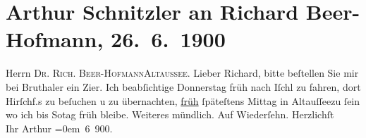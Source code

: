 

         
         \renewcommand{\erwaehntePersonen}{Personen: Richard Beer-Hofmann, Georg Hirschfeld, Elly Petersen}
         \renewcommand{\erwaehnteOrte}{Orte: Altaussee, Bad Ischl, Gasthaus Brunnthaler, IX., Alsergrund, Wien}
         \renewcommand{\erwaehnteWerke}{}
               \section[Arthur Schnitzler an Richard Beer-Hofmann, 26. 6. 1900]{ Arthur Schnitzler an Richard Beer-Hofmann,
               26. 6. 1900}\nopagebreak{}\rehead{ }\begin{ledgroupsized}[t]{13cm}\normalsize\beginnumbering \toendnotes[C]{\smallbreak\pagebreak[2]} 
\pstart{}{\pb}Herrn \textsc{Dr. Rich.
                     Beer-Hofmann}\pend{}\pstart{}\textsc{Altaussee.}\pend{}{\bigskip}\pstart
           \noindent{}{\pb}Lieber Richard, bitte beſtellen Sie
               mir bei Bru{\geminationn}thaler
               ein Zi{\geminationm}er. Ich beabſichtige Donnerstag früh
               nach Iſchl zu fahren, dort Hirſchf.s zu beſuchen u zu übernachten, \uline{früh} ſpäteſtens Mittag in Altauſſeezu ſein wo ich bis So{\geminationn}tag früh bleibe. Weiteres mündlich.\pend
           \pstart
           Auf Wiederſehn. Herzlichſt{\\[\baselineskip]}Ihr \spacefill\mbox{Arthur}\pend
           \leftskip=0em{} 6 900.\pend
           
         
         \endnumbering{}\end{ledgroupsized}  \newcommand{\dateiname}{L01050}\newcommand{\titel}{Arthur Schnitzler an Richard Beer-Hofmann, 26. 6. 1900}\newcommand{\editorInnen}{Martin Anton Müller und Gerd-Hermann Susen}
      